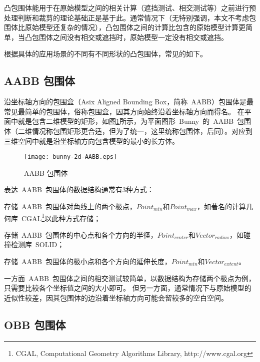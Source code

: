 凸包围体能用于在原始模型之间的相关计算（遮挡测试、相交测试等）之前进行预处理判断和裁剪的理论基础正是基于此。通常情况下（无特别强调，本文不考虑包围体比原始模型还复杂的情况），凸包围体之间的计算比包含的原始模型计算更简单，当凸包围体之间没有相交或遮挡时，原始模型一定没有相交或遮挡。

根据具体的应用场景的不同有不同形状的凸包围体，常见的如下。

\subsection{AABB 包围体}

沿坐标轴方向的包围盒（Asix Aligned Bounding Box，简称~AABB）包围体是最常见最简单的包围体，俗称包围盒，因其方向始终沿着坐标轴方向\cite{bergen1997efficient}而得名。
在平面中就是包含二维模型的矩形，如图\ref{fig:aabb-bunny}所示，为平面图形~Bunny~的~AABB~包围体（二维情况称包围矩形更合适，但为了统一，这里统称包围体，后同）。对应到三维空间中就是沿坐标轴方向包含模型的最小的长方体。
\begin{figure}[H] %
  \centering
  \texttt{[image: bunny-2d-AABB.eps]}
  \caption{AABB 包围体}
  \label{fig:aabb-bunny}
\end{figure}
表达~AABB~包围体的数据结构通常有3种方式：\\ \indent
\begin{inparaenum}[(1)]
\item 存储~AABB~包围体对角线上的两个极点，$Point_{min}$和$Point_{max}$，如著名的计算几何库~CGAL\footnote{CGAL, Computational Geometry Algorithms Library, http://www.cgal.org}以此种方式存储；\\ \indent
\item 存储~AABB~包围体的中心点和各个方向的半径，$Point_{center}$和$Vector_{radius}$，如碰撞检测库~SOLID\cite{bergen1997efficient}；\\ \indent
\item 存储~AABB~包围体的极小点和各个方向的延伸长度\cite{ericson2005real}，$Point_{min}$和$Vector_{extent}$。
\end{inparaenum} 

一方面~AABB~包围体之间的相交测试较简单，以数据结构为存储两个极点为例，只需要比较各个坐标值之间的大小即可。
但另一方面，通常情况下与原始模型的近似性较差，因其包围体的边沿着坐标轴方向可能会留较多的空白空间。

\subsection{OBB 包围体}

